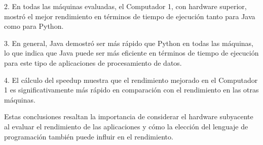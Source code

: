 \documentclass[conference]{IEEEtran}
\begin{document}
2. En todas las máquinas evaluadas, el Computador 1, con hardware superior, mostró el mejor rendimiento en términos de tiempo de ejecución tanto para Java como para Python.

3. En general, Java demostró ser más rápido que Python en todas las máquinas, lo que indica que Java puede ser más eficiente en términos de tiempo de ejecución para este tipo de aplicaciones de procesamiento de datos.

4. El cálculo del speedup muestra que el rendimiento mejorado en el Computador 1 es significativamente más rápido en comparación con el rendimiento en las otras máquinas.

Estas conclusiones resaltan la importancia de considerar el hardware subyacente al evaluar el rendimiento de las aplicaciones y cómo la elección del lenguaje de programación también puede influir en el rendimiento.
\end{document}
